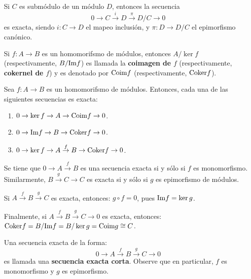 \documentclass[12pt]{report}
\newcounter{it}
\theoremstyle{largebreak}
\newcommand\cf[3]{\ensuremath{#1:#2\rightarrow#3}}
\newcommand{\im}{\ensuremath{\textup{Im}}}
\newcommand{\coim}{\textup{Coim}}
\newcommand{\coker}{\textup{Coker}}
\begin{document}
    \begin{exa}
        Si $C$ es submódulo de un módulo $D$, entonces la secuencia
        \begin{equation*}
            0\rightarrow C\overset{i}{\rightarrow}D\overset{\pi}{\rightarrow}D/C\rightarrow0
        \end{equation*}
        es exacta, siendo $\cf{i}{C}{D}$ el mapeo inclusión, y $\cf{\pi}{D}{D/C}$ el epimorfismo canónico.
    \end{exa}

    \begin{mydef}
        Si $\cf{f}{A}{B}$ es un homomorifsmo de módulos, entonces $A/\ker f$ (respectivamente, $B/\im f$) es llamada la \textbf{coimagen de $f$} (respectivamente, \textbf{cokernel de $f$}) y es denotado por $\coim f$ (respectivamente, $\coker f$).
    \end{mydef}

    \begin{exa}
        Sea $\cf{f}{A}{B}$ es un homomorifsmo de módulos. Entonces, cada una de las siguientes secuencias es exacta:
        \begin{enumerate}[label = \textit{(\alph*)}]
            \item $0\rightarrow\ker f\rightarrow A\rightarrow\coim f\rightarrow0$.
            \item $0\rightarrow\im f\rightarrow B\rightarrow \coker f\rightarrow0$.
            \item $0\rightarrow\ker f\rightarrow A\overset{f}{\rightarrow}B\rightarrow\coker f\rightarrow0$.
        \end{enumerate}
    \end{exa}

    \begin{obs}
        Se tiene que $0\rightarrow A\overset{f}{\rightarrow}B$ es una secuencia exacta si y sólo si $f$ es monomorfismo. Similarmente, $B\overset{g}{\rightarrow}C\rightarrow C$ es exacta si y sólo si $g$ es epimorfismo de módulos.

        Si $A\overset{f}{\rightarrow}B\overset{g}{\rightarrow}C$ es exacta, entonces: $g\circ f=0$, pues $\im f=\ker g$.

        Finalmente, si $A\overset{f}{\rightarrow}B\overset{g}{\rightarrow}C\rightarrow0$ es exacta, entonces: $\coker f=B/\im f= B/\ker g=\coim g\cong C$.
    \end{obs}

    \begin{mydef}
        Una secuencia exacta de la forma:
        \begin{equation*}
            0\rightarrow A\overset{f}{\rightarrow}B\overset{g}{\rightarrow}C\rightarrow0
        \end{equation*}
        es llamada una \textbf{secuencia exacta corta}. Observe que en particular, $f$ es monomorfismo y $g$ es epimorfismo.
    \end{mydef}
\end{document}
